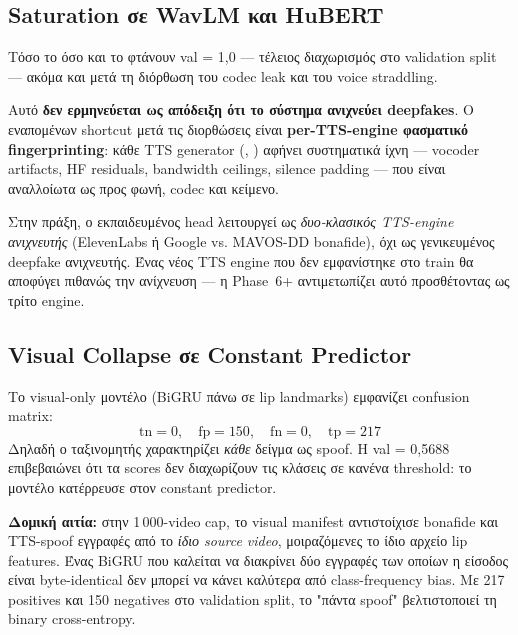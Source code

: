 \subsection{Saturation σε WavLM και HuBERT}
\label{subsec:saturation}

Τόσο το  όσο και το  φτάνουν
val \AUC{} = 1{,}0 — τέλειος διαχωρισμός στο validation split —
ακόμα και μετά τη διόρθωση του codec leak και του voice straddling.

Αυτό \textbf{δεν ερμηνεύεται ως απόδειξη ότι το σύστημα
ανιχνεύει deepfakes}.
Ο εναπομένων shortcut μετά τις διορθώσεις είναι
\textbf{per-TTS-engine φασματικό fingerprinting}:
κάθε TTS generator
(, )
αφήνει συστηματικά ίχνη — vocoder artifacts, HF residuals,
bandwidth ceilings, silence padding —
που είναι αναλλοίωτα ως προς φωνή, codec και κείμενο.

Στην πράξη, ο εκπαιδευμένος head λειτουργεί ως
\emph{δυο-κλασικός TTS-engine ανιχνευτής}
(ElevenLabs ή Google vs. MAVOS-DD bonafide),
όχι ως γενικευμένος deepfake ανιχνευτής.
Ένας νέος TTS engine που δεν εμφανίστηκε στο train
θα αποφύγει πιθανώς την ανίχνευση —
η Phase~6+ αντιμετωπίζει αυτό προσθέτοντας 
ως τρίτο engine.

\subsection{Visual Collapse σε Constant Predictor}
\label{subsec:visual-collapse}

Το visual-only μοντέλο (BiGRU πάνω σε lip landmarks)
εμφανίζει confusion matrix:
\[
  \text{tn} = 0,\quad \text{fp} = 150,\quad \text{fn} = 0,\quad \text{tp} = 217
\]
Δηλαδή ο ταξινομητής χαρακτηρίζει \emph{κάθε} δείγμα ως spoof.
Η val \AUC{} = 0{,}5688 επιβεβαιώνει ότι τα scores δεν
διαχωρίζουν τις κλάσεις σε κανένα threshold:
το μοντέλο κατέρρευσε στον constant predictor.

\textbf{Δομική αιτία:}
στην 1\,000-video cap, το visual manifest αντιστοίχισε
bonafide και TTS-spoof εγγραφές από το \emph{ίδιο source video},
μοιραζόμενες το ίδιο  αρχείο lip features.
Ένας BiGRU που καλείται να διακρίνει δύο εγγραφές
των οποίων η είσοδος είναι byte-identical
δεν μπορεί να κάνει καλύτερα από class-frequency bias.
Με 217 positives και 150 negatives στο validation split,
το "πάντα spoof" βελτιστοποιεί τη binary cross-entropy.

